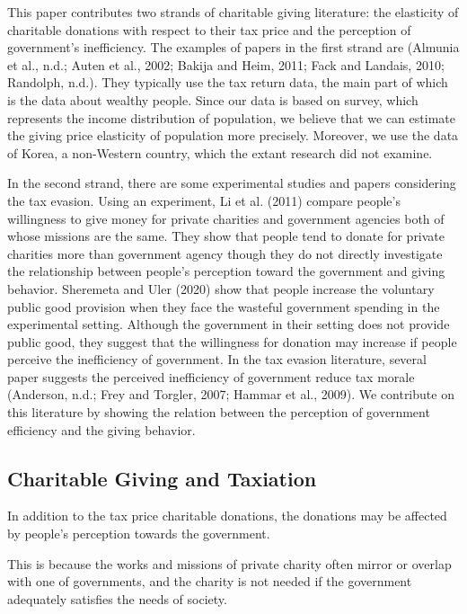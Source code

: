 \documentclass[ review  , 3p ]{elsarticle}
\begin{document}
  This paper contributes two strands of charitable giving literature: the elasticity of charitable donations with respect to their tax price and the perception of government's inefficiency. The examples of papers in the first strand are (Almunia et al., n.d.; Auten et al., 2002; Bakija and Heim, 2011; Fack and Landais, 2010; Randolph, n.d.). They typically use the tax return data, the main part of which is the data about wealthy people. Since our data is based on survey, which represents the income distribution of population, we believe that we can estimate the giving price elasticity of population more precisely. Moreover, we use the data of Korea, a non-Western country, which the extant research did not examine.
  
  In the second strand, there are some experimental studies and papers considering the tax evasion. Using an experiment, Li et al. (2011) compare people's willingness to give money for private charities and government agencies both of whose missions are the same. They show that people tend to donate for private charities more than government agency though they do not directly investigate the relationship between people's perception toward the government and giving behavior. Sheremeta and Uler (2020) show that people increase the voluntary public good provision when they face the wasteful government spending in the experimental setting. Although the government in their setting does not provide public good, they suggest that the willingness for donation may increase if people perceive the inefficiency of government. In the tax evasion literature, several paper suggests the perceived inefficiency of government reduce tax morale (Anderson, n.d.; Frey and Torgler, 2007; Hammar et al., 2009). We contribute on this literature by showing the relation between the perception of government efficiency and the giving behavior.
  
  \hypertarget{charitable-giving-and-taxiation-1}{%
  \subsection{Charitable Giving and Taxiation}\label{charitable-giving-and-taxiation-1}}
  
  In addition to the tax price charitable donations, the donations may be affected by people's perception towards the government.
  
  This is because the works and missions of private charity often mirror or overlap with one of governments, and the charity is not needed if the government adequately satisfies the needs of society.
  
\end{document}

